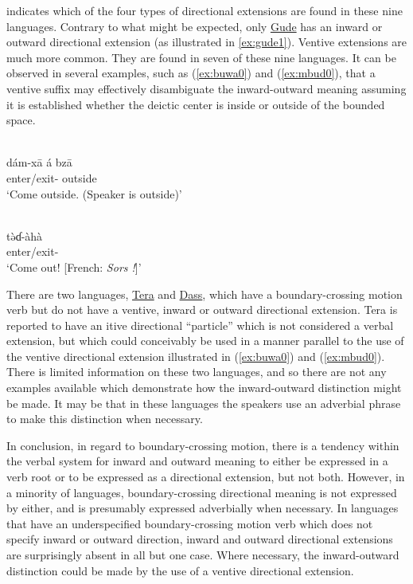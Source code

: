  indicates which of the four types of directional extensions are found in these nine languages. Contrary to what might be expected, only \hyperref[gude]{Gude} has an inward or outward directional extension (as illustrated in \ref{ex:gude1}). Ventive extensions are much more common. They are found in seven of these nine languages. It can be observed in several examples, such as (\ref{ex:buwa0}) and  (\ref{ex:mbud0}), that a ventive suffix may effectively disambiguate the inward-outward meaning assuming it is established whether the deictic center is inside or outside of the bounded space.

\ea\label{ex:buwa0}
 \\
\gll dám-xā á bzā	\\
enter/exit-  outside		\\
\glt `Come outside. (Speaker is outside)'

\ex\label{ex:mbud0}
  \\
\gll tə̀ɗ-àhà	\\
enter/exit-	\\
\glt `Come out! [French: \textit{Sors !}]'
\z 

There are two languages, \hyperref[tera]{Tera} and \hyperref[dass]{Dass}, which have a boundary-crossing motion verb but do not have a ventive, inward or outward directional extension. Tera is reported to have an itive directional ``particle'' which is not considered a verbal extension, but which could conceivably be used in a manner parallel to the use of the ventive directional extension illustrated in (\ref{ex:buwa0}) and  (\ref{ex:mbud0}). There is limited information on these two languages, and so there are not any examples available which demonstrate how the inward-outward distinction might be made. It may be that in these languages the speakers use an adverbial phrase to make this distinction when necessary.

In conclusion, in regard to boundary-crossing motion, there is a tendency within the verbal system for inward and outward meaning to either be expressed in a verb root or to be expressed as a directional extension, but not both. However, in a minority of languages, boundary-crossing directional meaning is not expressed by either, and is presumably expressed adverbially when necessary. In languages that have an underspecified boundary-crossing motion verb which does not specify inward or outward direction, inward and outward directional extensions are surprisingly absent in all but one case. Where necessary, the inward-outward distinction could be made by the use of a ventive directional extension. 

